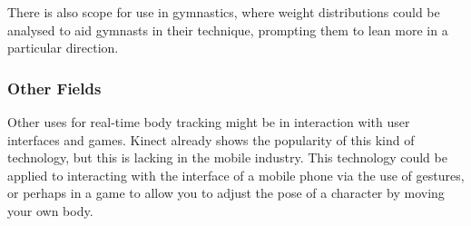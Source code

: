 There is also scope for use in gymnastics, where weight distributions could be analysed to aid gymnasts in their technique, prompting them to lean more in a particular direction.

\subsubsection{Other Fields}

Other uses for real-time body tracking might be in interaction with user interfaces and games. Kinect already shows the popularity of this kind of technology, but this is lacking in the mobile industry. This technology could be applied to interacting with the interface of a mobile phone via the use of gestures, or perhaps in a game to allow you to adjust the pose of a character by moving your own body.

